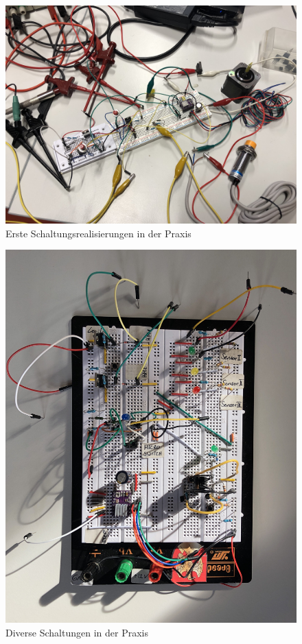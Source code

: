 \begin{figure}[htb]
    \centering
    \includegraphics[scale=0.065]{fig/elektro/ErsteSteckbrettVersuche.jpg}
    \caption{Erste Schaltungsrealisierungen in der Praxis}
\end{figure}

\begin{figure}[htb]
    \centering
    \includegraphics[scale=0.075]{fig/elektro/Steckbrett}
    \caption{Diverse Schaltungen in der Praxis}
\end{figure}

